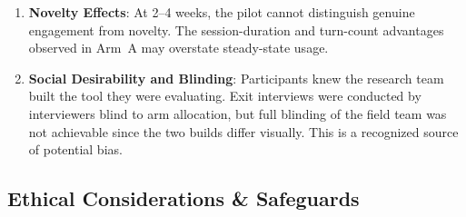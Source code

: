 \begin{enumerate}
    \item \textbf{Novelty Effects}: At 2--4 weeks, the pilot cannot distinguish genuine engagement from novelty. The session-duration and turn-count advantages observed in Arm~A may overstate steady-state usage.
    \item \textbf{Social Desirability and Blinding}: Participants knew the research team built the tool they were evaluating. Exit interviews were conducted by interviewers blind to arm allocation, but full blinding of the field team was not achievable since the two builds differ visually. This is a recognized source of potential bias.
\end{enumerate}

\subsection{Ethical Considerations \& Safeguards}
\label{subsec:discussion-ethics}

